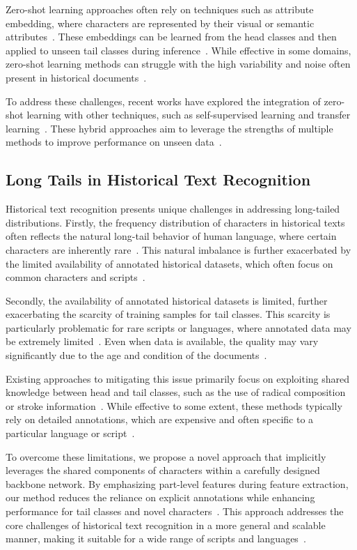 Zero-shot learning approaches often rely on techniques such as attribute embedding, where characters are represented by their visual or semantic attributes~\cite{attrEmb}. These embeddings can be learned from the head classes and then applied to unseen tail classes during inference~\cite{transfer}. While effective in some domains, zero-shot learning methods can struggle with the high variability and noise often present in historical documents~\cite{noise}.

To address these challenges, recent works have explored the integration of zero-shot learning with other techniques, such as self-supervised learning and transfer learning~\cite{selfsup, transfer}. These hybrid approaches aim to leverage the strengths of multiple methods to improve performance on unseen data~\cite{hybrid}.

\subsection{Long Tails in Historical Text Recognition}

Historical text recognition presents unique challenges in addressing long-tailed distributions. Firstly, the frequency distribution of characters in historical texts often reflects the natural long-tail behavior of human language, where certain characters are inherently rare~\cite{yang2022survey}. This natural imbalance is further exacerbated by the limited availability of annotated historical datasets, which often focus on common characters and scripts~\cite{datasetlimit}.

Secondly, the availability of annotated historical datasets is limited, further exacerbating the scarcity of training samples for tail classes. This scarcity is particularly problematic for rare scripts or languages, where annotated data may be extremely limited~\cite{rarelang}. Even when data is available, the quality may vary significantly due to the age and condition of the documents~\cite{damagedoc}.

Existing approaches to mitigating this issue primarily focus on exploiting shared knowledge between head and tail classes, such as the use of radical composition or stroke information~\cite{obcmk2, sanicdar23, fudanvi}. While effective to some extent, these methods typically rely on detailed annotations, which are expensive and often specific to a particular language or script~\cite{limitannot}.

To overcome these limitations, we propose a novel approach that implicitly leverages the shared components of characters within a carefully designed backbone network. By emphasizing part-level features during feature extraction, our method reduces the reliance on explicit annotations while enhancing performance for tail classes and novel characters~\cite{partfeat}. This approach addresses the core challenges of historical text recognition in a more general and scalable manner, making it suitable for a wide range of scripts and languages~\cite{generalizable}.

